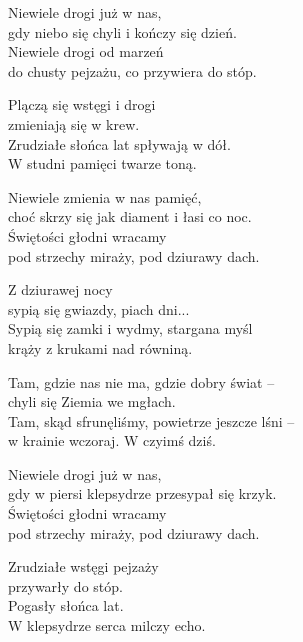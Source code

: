 \begin{text}
    Niewiele drogi już w nas,\\
    gdy niebo się chyli i kończy się dzień.\\
    Niewiele drogi od marzeń\\
    do chusty pejzażu, co przywiera do stóp.

    Plączą się wstęgi i drogi\\
    zmieniają się w krew.\\
    Zrudziałe słońca lat spływają w dół.\\
    W studni pamięci twarze toną.

    Niewiele zmienia w nas pamięć,\\
    choć skrzy się jak diament i łasi co noc.\\
    Świętości głodni wracamy\\
    pod strzechy miraży, pod dziurawy dach.

    Z dziurawej nocy\\
    sypią się gwiazdy, piach dni...\\
    Sypią się zamki i wydmy, stargana myśl\\
    krąży z krukami nad równiną.

    Tam, gdzie nas nie ma, gdzie dobry świat –\\
    chyli się Ziemia we mgłach.\\
    Tam, skąd sfrunęliśmy, powietrze jeszcze lśni –\\
    w krainie wczoraj. W czyimś dziś.

    Niewiele drogi już w nas,\\
    gdy w piersi klepsydrze przesypał się krzyk.\\
    Świętości głodni wracamy\\
    pod strzechy miraży, pod dziurawy dach.

    Zrudziałe wstęgi pejzaży\\
    przywarły do stóp.\\
    Pogasły słońca lat.\\
    W klepsydrze serca milczy echo.
\end{text}
\begin{chord}

\end{chord}